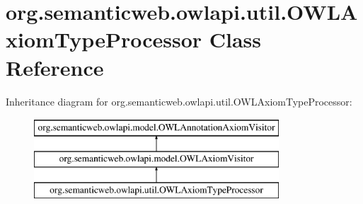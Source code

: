 \hypertarget{classorg_1_1semanticweb_1_1owlapi_1_1util_1_1_o_w_l_axiom_type_processor}{\section{org.\-semanticweb.\-owlapi.\-util.\-O\-W\-L\-Axiom\-Type\-Processor Class Reference}
\label{classorg_1_1semanticweb_1_1owlapi_1_1util_1_1_o_w_l_axiom_type_processor}
}
Inheritance diagram for org.\-semanticweb.\-owlapi.\-util.\-O\-W\-L\-Axiom\-Type\-Processor\-:\begin{figure}[H]
\begin{center}
\leavevmode
\includegraphics[height=3.000000cm]{classorg_1_1semanticweb_1_1owlapi_1_1util_1_1_o_w_l_axiom_type_processor}
\end{center}
\end{figure}
